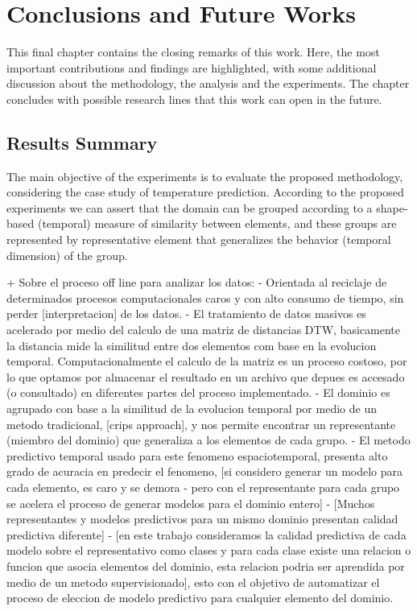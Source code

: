 \chapter{Conclusions and Future Works}
\label{chapter_Conclusions}

This final chapter contains the closing remarks of this work. Here, the most important contributions and findings are highlighted, with some additional discussion about the methodology, the analysis and the experiments. The chapter concludes with possible research lines that this work can open in the future.
	
\section{Results Summary}
\label{Sec:ResultsSummary}

The main objective of the experiments is to evaluate the proposed methodology, considering the case study of temperature prediction. According to the proposed experiments we can assert that the domain can be grouped according to a shape-based (temporal) measure of similarity between elements, and these groups are represented by representative element that generalizes the behavior (temporal dimension) of the group. 

+ Sobre el proceso off line para analizar los datos: 
	- Orientada al reciclaje de determinados procesos computacionales caros y con alto consumo de tiempo, sin perder [interpretacion] de los datos.
	- El tratamiento de datos masivos es acelerado por medio del calculo de una matriz de distancias DTW, basicamente la distancia mide la similitud entre dos elementos com base en la evolucion temporal. Computacionalmente el calculo de la matriz es un proceso costoso, por lo que optamos por almacenar el resultado en un archivo que depues es accesado (o consultado) en diferentes partes del proceso implementado.
	- El dominio es agrupado con base a la similitud de la evolucion temporal por medio de un metodo tradicional, [crips approach], y nos permite encontrar un representante (miembro del dominio) que generaliza a los elementos de cada grupo.
	- El metodo predictivo temporal usado para este fenomeno espaciotemporal, presenta alto grado de acuracia en predecir el fenomeno, [si considero generar un modelo para cada elemento, es caro y se demora - pero con el representante para cada grupo se acelera el proceso de generar modelos para el dominio entero]
	- [Muchos representantes y modelos predictivos para un mismo dominio presentan calidad predictiva diferente] 
	- [en este trabajo consideramos la calidad predictiva de cada modelo sobre el representativo como clases y para cada clase existe una {relacion o funcion} que asocia elementos del dominio, esta relacion podria ser aprendida por medio de un metodo supervisionado], esto con el objetivo de automatizar el proceso de eleccion de modelo predictivo para cualquier elemento del dominio.

